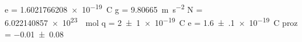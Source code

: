 e = \SI[]{1.6021766208e-19}{\coulomb}
g = \SI[]{9.80665}{\meter\per\second\squared}
N = \SI[]{6.022140857e+23}{\per\mole}
q = \SI{+2(1)e-19}{\coulomb}
e = \SI{+1.6(1)e-19}{\coulomb}
proz = \SI{-0.01(8)}{}
